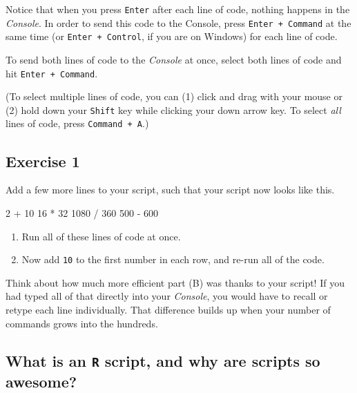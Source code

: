 \documentclass[
]{book}
\newenvironment{Shaded}{\begin{snugshade}}{\end{snugshade}}
\newcommand{\DecValTok}[1]{\textcolor[rgb]{0.00,0.00,0.81}{#1}}
\newcommand{\SpecialCharTok}[1]{\textcolor[rgb]{0.00,0.00,0.00}{#1}}
\providecommand{\tightlist}{%
  \setlength{\itemsep}{0pt}\setlength{\parskip}{0pt}}
\begin{document}
Notice that when you press \texttt{Enter} after each line of code, nothing happens in the \emph{Console}. In order to send this code to the Console, press \texttt{Enter\ +\ Command} at the same time (or \texttt{Enter\ +\ Control}, if you are on Windows) for each line of code.

To send both lines of code to the \emph{Console} at once, select both lines of code and hit \texttt{Enter\ +\ Command}.

(To select multiple lines of code, you can (1) click and drag with your mouse or (2) hold down your \texttt{Shift} key while clicking your down arrow key. To select \emph{all} lines of code, press \texttt{Command\ +\ A}.)

\hypertarget{exercise-1-1}{%
\subsection*{Exercise 1}\label{exercise-1-1}}

Add a few more lines to your script, such that your script now looks like this.

\begin{Shaded}
\begin{Highlighting}[]
\DecValTok{2}  \SpecialCharTok{+} \DecValTok{10}
\DecValTok{16} \SpecialCharTok{*} \DecValTok{32}
\DecValTok{1080} \SpecialCharTok{/} \DecValTok{360}
\DecValTok{500} \SpecialCharTok{{-}} \DecValTok{600}
\end{Highlighting}
\end{Shaded}

\begin{enumerate}
\def\labelenumi{(\Alph{enumi})}
\tightlist
\item
  Run all of these lines of code at once.\\
\item
  Now add \texttt{10} to the first number in each row, and re-run all of the code.
\end{enumerate}

Think about how much more efficient part (B) was thanks to your script! If you had typed all of that directly into your \emph{Console}, you would have to recall or retype each line individually. That difference builds up when your number of commands grows into the hundreds.

\hypertarget{what-is-an-r-script-and-why-are-scripts-so-awesome}{%
\subsection*{\texorpdfstring{What is an \texttt{R} script, and why are scripts so awesome?}{What is an R script, and why are scripts so awesome?}}\label{what-is-an-r-script-and-why-are-scripts-so-awesome}}
\end{document}
